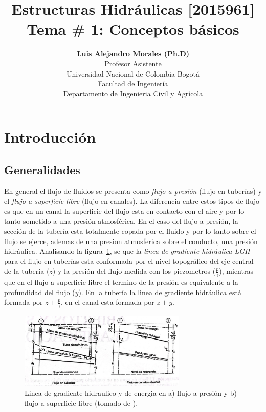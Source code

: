 \documentclass[11pt, oneside]{article}
\title{Estructuras Hidr\'aulicas [2015961] \\ \textbf{Tema \# 1: Conceptos b\'asicos}}
\author{\textbf{Luis Alejandro Morales (Ph.D)}\\ \vspace{0.4cm} Profesor Asistente \\ Universidad Nacional de Colombia-Bogot\'a\\Facultad de Ingenier\'ia \\ Departamento de Ingenieria Civil y Agr\'icola}
\date{}
\begin{document}
\maketitle
\tableofcontents


\section{Introducci\'on} %
\subsection{Generalidades}
En general el flujo de fluidos se presenta como \emph{flujo a presi\'on} (flujo en tuber\'ias) y el \emph{flujo a superficie libre} (flujo en canales). La diferencia entre estos tipos de flujo es que en un canal la superficie del flujo esta en contacto con el aire y por lo tanto sometido a una presi\'on atmosf\'erica. En el caso del flujo a presi\'on, la secci\'on de la tuber\'ia esta totalmente copada por el fluido y por lo tanto sobre el flujo se ejerce, ademas de una presion atmosferica sobre el conducto, una presi\'on hidr\'aulica. Analisando la figura~\ref{fig1}, se que la \emph{linea de gradiente hidr\'aulica {LGH}} para el flujo en tuber\'ias esta conformada por el nivel topogr\'afico del eje central de la tuber\'ia ($z$) y la presi\'on del flujo medida con los piezometros ($\frac{p}{\gamma}$), mientras que en el flujo a superficie libre el termino de la presi\'on es equivalente a la profundidad del flujo ($y$). En la tuber\'ia la linea de gradiente hidr\'aulica est\'a formada por $z + \frac{p}{\gamma}$, en el canal esta formada por $z+y$. 
\begin{figure}[h]
\centering
\includegraphics[width=8cm]{fig1.jpeg}
\caption{Linea de gradiente hidraulico y de energia en a) flujo a presi\'on y b) flujo a superficie libre (tomado de \cite{VChow}).}
\label{fig1}
\end{figure}
\end{document}
